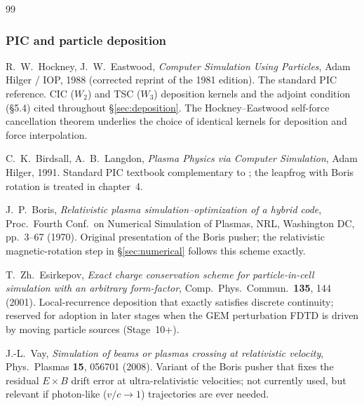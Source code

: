 \documentclass[11pt,a4paper]{article}
\begin{document}
\begin{thebibliography}{99}
\subsubsection*{PIC and particle deposition}

R.~W.~Hockney, J.~W.~Eastwood, \emph{Computer Simulation Using
Particles}, Adam Hilger / IOP, 1988 (corrected reprint of the 1981
edition).  The standard PIC reference.  CIC ($W_2$) and TSC ($W_3$)
deposition kernels and the adjoint condition (\S5.4) cited
throughout \S\ref{sec:deposition}.  The Hockney--Eastwood self-force
cancellation theorem underlies the choice of identical kernels for
deposition and force interpolation.

C.~K.~Birdsall, A.~B.~Langdon, \emph{Plasma Physics via Computer
Simulation}, Adam Hilger, 1991.  Standard PIC textbook complementary
to \cite{HockneyEastwood1988}; the leapfrog with Boris rotation is
treated in chapter~4.

J.~P.~Boris, \emph{Relativistic plasma simulation--optimization of a
hybrid code}, Proc.~Fourth Conf.~on Numerical Simulation of Plasmas,
NRL, Washington DC, pp.~3--67 (1970).  Original presentation of the
Boris pusher; the relativistic magnetic-rotation step in
\S\ref{sec:numerical} follows this scheme exactly.

T.~Zh.~Esirkepov, \emph{Exact charge conservation scheme for
particle-in-cell simulation with an arbitrary form-factor},
Comp.~Phys.~Commun.~\textbf{135}, 144 (2001).  Local-recurrence
deposition that exactly satisfies discrete continuity; reserved for
adoption in later stages when the GEM perturbation FDTD is driven by
moving particle sources (Stage~10+).

J.-L.~Vay, \emph{Simulation of beams or plasmas crossing at
relativistic velocity}, Phys.~Plasmas \textbf{15}, 056701 (2008).
Variant of the Boris pusher that fixes the residual $E\times B$
drift error at ultra-relativistic velocities; not currently used,
but relevant if photon-like ($v/c \to 1$) trajectories are ever
needed.

\end{thebibliography}

\end{document}
